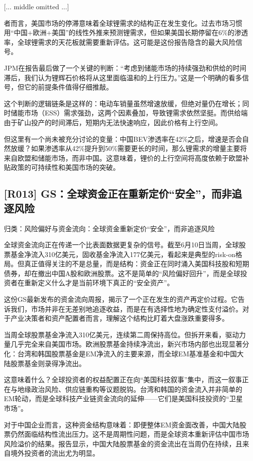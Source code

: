 \documentclass[11pt]{ctexart}
\begin{document}
[... middle omitted ...]

者而言，美国市场的停滞意味着全球锂需求的结构正在发生变化。过去市场习惯用“中国+欧洲+美国”的线性外推来预测锂需求，但如果美国长期停留在6\%的渗透率，全球锂需求的天花板就需要重新评估。这可能是这份报告隐含的最大风险信号。

JPM在报告最后做了一个关键的判断：“考虑到储能市场的持续强劲和供给的时间滞后，我们认为锂辉石价格将从这里面临温和的上行压力。”这是一个明确的看多信号，但它的前提条件值得仔细推敲。

这个判断的逻辑链条是这样的：电动车销量虽然增速放缓，但绝对量仍在增长；同时储能市场（ESS）需求强劲，这两个因素叠加，导致锂需求依然坚挺。而供给端由于矿山投产的时间滞后，短期内无法快速响应，因此价格有上行空间。

但这里有一个尚未被充分讨论的变量：中国BEV渗透率在42\%之后，增速是否会自然放缓？如果渗透率从42\%提升到50\%需要更长的时间，那么锂需求的增量主要将来自欧盟和储能市场，而非中国。这意味着，锂价的上行空间将高度依赖于欧盟补贴政策的可持续性和美国市场的突破。

\subsection{[R013] GS：全球资金正在重新定价“安全”，而非追逐风险}
{\small\color{refgray}归类：风险偏好与资金流向：全球资金重新定价“安全”，而非追逐风险}

全球资金流向正在传递一个比表面数据更复杂的信号。截至6月10日当周，全球股票基金净流入310亿美元，固收基金净流入177亿美元，看起来是典型的risk-on格局。但真正值得关注的不是总量，而是结构：资金正在同时涌入美国科技股和短期债券，却在撤出中国A股和欧洲股票。这不是简单的“风险偏好回升”，而是全球投资者在重新定义什么才是当前环境下真正的“安全资产”。

这份GS最新发布的资金流向周报，揭示了一个正在发生的资产再定价过程。它告诉我们，市场并非在无差别地追逐收益，而是在有选择性地为确定性支付溢价。对于产业决策者和资产配置者而言，理解这个结构比盯着大盘涨跌重要得多。

当周全球股票基金净流入310亿美元，连续第二周保持高位。但拆开来看，驱动力量几乎完全来自美国市场。欧洲股票基金持续净流出，新兴市场内部也出现显著分化：台湾和韩国股票基金是EM净流入的主要来源，而全球EM基准基金和中国大陆股票基金则录得净流出。

这意味着什么？全球投资者的权益配置正在向“美国科技叙事”集中，而这一叙事正在与地缘政治风险、供应链重构等议题脱钩。台湾和韩国的资金流入并非简单的EM轮动，而是全球科技产业链资金流向的延伸——它们是美国科技投资的“卫星市场”。

对于中国企业而言，这种资金结构意味着：即便整体EM资金面改善，中国大陆股票仍然面临结构性流出压力。这不是周期性问题，而是全球资本重新评估中国市场风险溢价的结果。报告显示，中国大陆股票基金的资金流出在当周仍在持续，且来自境外投资者的流出尤为明显。
\end{document}
